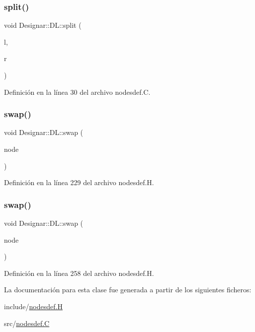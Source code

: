 \mbox{\label{class_designar_1_1_d_l_a81ed81ffd61fde1419fb4fb87ba551e3}} 
\subsubsection{\texorpdfstring{split()}{split()}}
{\footnotesize\ttfamily void Designar\+::\+D\+L\+::split (\begin{DoxyParamCaption}\item[{\hyperlink{class_designar_1_1_d_l}{DL} \&}]{l,  }\item[{\hyperlink{class_designar_1_1_d_l}{DL} \&}]{r }\end{DoxyParamCaption})}



Definición en la línea 30 del archivo nodesdef.\+C.

\mbox{\label{class_designar_1_1_d_l_a3a6b3f9fe3da01008ebf5f60bdf20bbc}} 
\subsubsection{\texorpdfstring{swap()}{swap()}\hspace{0.1cm}{\footnotesize\ttfamily [1/2]}}
{\footnotesize\ttfamily void Designar\+::\+D\+L\+::swap (\begin{DoxyParamCaption}\item[{\hyperlink{class_designar_1_1_d_l}{DL} $\ast$}]{node }\end{DoxyParamCaption})\hspace{0.3cm}{\ttfamily [inline]}}



Definición en la línea 229 del archivo nodesdef.\+H.

\mbox{\label{class_designar_1_1_d_l_a7b32539230a7ce8c23a8439bac4f3a12}} 
\subsubsection{\texorpdfstring{swap()}{swap()}\hspace{0.1cm}{\footnotesize\ttfamily [2/2]}}
{\footnotesize\ttfamily void Designar\+::\+D\+L\+::swap (\begin{DoxyParamCaption}\item[{\hyperlink{class_designar_1_1_d_l}{DL} \&}]{node }\end{DoxyParamCaption})\hspace{0.3cm}{\ttfamily [inline]}}



Definición en la línea 258 del archivo nodesdef.\+H.



La documentación para esta clase fue generada a partir de los siguientes ficheros\+:\begin{DoxyCompactItemize}
\item 
include/\hyperlink{nodesdef_8_h}{nodesdef.\+H}\item 
src/\hyperlink{nodesdef_8_c}{nodesdef.\+C}\end{DoxyCompactItemize}
